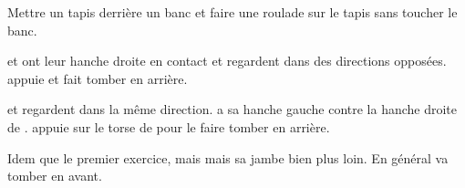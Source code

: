 \begin{exercice}
Mettre un tapis derrière un banc et faire une roulade sur le tapis sans toucher le banc.
\end{exercice}


\begin{exercice}
\A et \D ont leur hanche droite en contact et regardent dans des directions opposées.
\A appuie et fait tomber \D en arrière.

\end{exercice}


\begin{exercice}
\A et \D regardent dans la même direction.
\A a sa hanche gauche contre la hanche droite de \D.
\A appuie sur le torse de \D pour le faire tomber en arrière.

\end{exercice}


\begin{exercice}
Idem que le premier exercice, mais \A mais sa jambe bien plus loin.
En général \D va tomber en avant.

\end{exercice}

